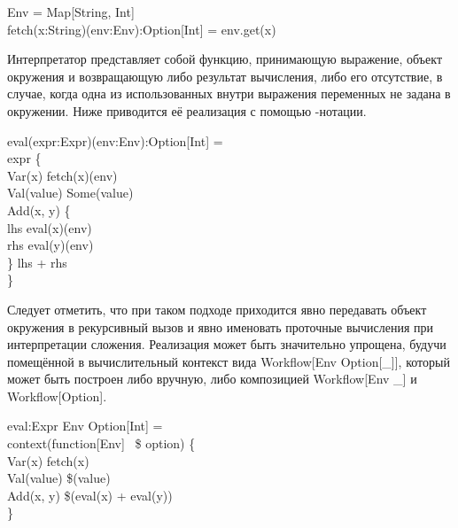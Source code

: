 \begin{haskell}
 Env = Map[String, Int] \\
 fetch(x:String)(env:Env):Option[Int] = env.get(x)
\end{haskell}

Интерпретатор представляет собой функцию, принимающую выражение, объект окружения и возвращающую либо результат вычисления, либо его отсутствие, в случае, когда одна из использованных внутри выражения переменных не задана в окружении. Ниже приводится её реализация с помощью \<\>-нотации.

\begin{haskell}
 eval(expr:Expr)(env:Env):Option[Int] = \\
\quad\quad expr  \{ \\
\quad\quad\quad {} Var(x) \Rightarrow fetch(x)(env) \\
\quad\quad\quad {} Val(value) \Rightarrow Some(value) \\
\quad\quad\quad {} Add(x, y) \Rightarrow {} \{ \\
\quad\quad\quad\quad lhs \hsfrom eval(x)(env) \\
\quad\quad\quad\quad rhs \hsfrom eval(y)(env) \\
\quad\quad\quad \}  lhs + rhs \\
\quad\quad \}
\end{haskell}

Следует отметить, что при таком подходе приходится явно передавать объект окружения в рекурсивный вызов и явно именовать проточные вычисления при интерпретации сложения. Реализация может быть значительно упрощена, будучи помещённой в вычислительный контекст вида \<Workflow[Env \Rightarrow Option[\_]]\>, который может быть построен либо вручную, либо композицией \<Workflow[Env \Rightarrow \_]\> и \<Workflow[Option]\>.

\begin{haskell}
 eval:Expr \Rightarrow Env \Rightarrow Option[Int] = \\
\quad\quad context(function[Env] ~\$ option) \{ \\
\quad\quad\quad {} Var(x) \Rightarrow fetch(x) \\
\quad\quad\quad {} Val(value) \Rightarrow \$(value) \\
\quad\quad\quad {} Add(x, y) \Rightarrow \$(eval(x) + eval(y)) \\
\quad\quad \}
\end{haskell}

